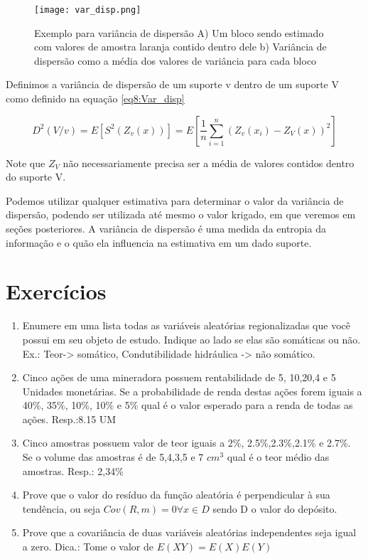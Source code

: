 \begin{figure}[H]
\centering
\texttt{[image: var\_disp.png]}
\caption{Exemplo para variância de dispersão A) Um bloco sendo estimado com valores de amostra laranja contido dentro dele b) Variância de dispersão como a média dos valores de variância para cada bloco}
\label{var_disp}
\end{figure}

Definimos a variância de dispersão de um suporte v dentro de um suporte V como definido na equação \eqref{eq8:Var_disp}

\begin{equation}\label{eq8:Var_disp}
D^{2}(V/v)=E[S^{2}(Z_{v}(x))]=E\left[\frac{1}{n}\sum_{i=1}^{n}\left(Z_{v}(x_{i})-Z_{V}(x)\right)^2\right]
\end{equation}


Note que $Z_{V}$ não necessariamente precisa ser a média de valores contidos dentro do suporte V.

Podemos utilizar qualquer estimativa para determinar o valor da variância de dispersão, podendo ser utilizada até mesmo o valor krigado, em que veremos em seções posteriores. A variância de dispersão é uma medida da entropia da informação e o quão ela influencia na estimativa em um dado suporte. 

\section{Exercícios}

\begin{enumerate}
	\item Enumere em uma lista todas as variáveis aleatórias regionalizadas que você possui em seu objeto de estudo. Indique ao lado se elas são somáticas ou não. Ex.: Teor-> somático, Condutibilidade hidráulica -> não somático.
	\item Cinco ações de uma mineradora possuem rentabilidade de 5, 10,20,4 e 5 Unidades monetárias. Se a probabilidade de renda destas ações forem iguais a 40\%, 35\%, 10\%, 10\% e 5\% qual é o valor esperado para a renda de todas as ações. Resp.:8.15 UM
	\item Cinco amostras possuem valor de teor iguais a 2\%, 2.5\%,2.3\%,2.1\% e 2.7\%. Se o volume das amostras é de 5,4,3,5 e 7 $cm^3$ qual é o teor médio das amostras. Resp.: 2,34\%
	\item Prove que o valor do resíduo da função aleatória é perpendicular à sua tendência, ou seja $Cov(R,m) = 0 \forall x \in D$ sendo D o valor do depósito.
	\item Prove que a covariância de duas variáveis aleatórias independentes seja igual a zero. Dica.: Tome o valor de $E(XY) = E(X)E(Y)$
	
\end{enumerate}

 